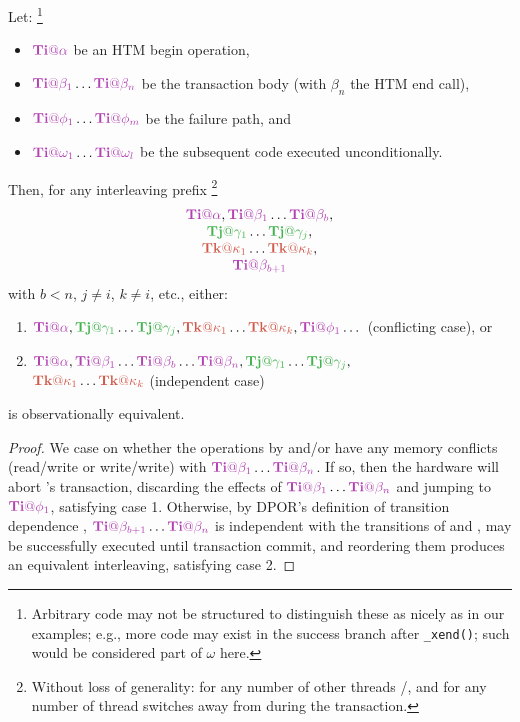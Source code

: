 \documentclass[10pt]{sigplanconf}
\begin{document}
\begin{lemma}
	\label{lem:equiv}
	Let:%
	\footnote{Arbitrary code may not be structured to distinguish these as nicely as in our examples;
	e.g., more code may exist in the success branch after {\tt \_xend()};
	such would be considered part of $\omega$ here.}
	\begin{itemize}
		\item $\tiiat{\alpha}$ be an HTM begin operation,
		\item $\tiiat{\beta_1}\dots\tiiat{\beta_n}$ be the transaction body (with $\beta_n$ the HTM end call),
		\item $\tiiat{\phi_1}\dots\tiiat{\phi_m}$ be the failure path, and
		\item $\tiiat{\omega_1}\dots\tiiat{\omega_l}$ be the subsequent code executed unconditionally.
	\end{itemize}
	Then, for any interleaving prefix%
	\footnote{Without loss of generality: for any number of other threads \tjj/\tkk,
	and for any number of thread switches away from \tii during the transaction.}
	\[
	\begin{tabular}{c}
		$\tiiat{\alpha},\tiiat{\beta_1}\dots\tiiat{\beta_b},$\\
		$\tjjat{\gamma_1}\dots\tjjat{\gamma_j},$ \\
		$\tkkat{\kappa_1}\dots\tkkat{\kappa_k},$ \\
		$\tiiat{\beta_{b+1}}$ %
	\end{tabular}
	\]
	with $b<n$, $j \ne i$, $k \ne i$, etc., either:
	\begin{enumerate}
		\item $\tiiat{\alpha},\tjjat{\gamma_1}\dots\tjjat{\gamma_j},\tkkat{\kappa_1}\dots\tkkat{\kappa_k},\tiiat{\phi_1}\dots$
			(conflicting case), or
		\item $\tiiat{\alpha},\tiiat{\beta_1}\dots\tiiat{\beta_b}\dots\tiiat{\beta_n},\tjjat{\gamma_1}\dots\tjjat{\gamma_j},$ \\
			$\tkkat{\kappa_1}\dots\tkkat{\kappa_k}$
			(independent case)
	\end{enumerate}
	is observationally equivalent.
\end{lemma}

\begin{proof}
	We case on whether the operations by \tjj and/or \tkk have any memory conflicts (read/write or write/write)
	with $\tiiat{\beta_1}\dots\tiiat{\beta_n}$.
	If so, then the hardware will abort \tii's transaction, discarding the effects of $\tiiat{\beta_1}\dots\tiiat{\beta_n}$
	and jumping to $\tiiat{\phi_1}$,
	satisfying case 1.
	Otherwise, by DPOR's definition of transition dependence \cite{dpor,landslide-phdthesis},
	$\tiiat{\beta_{b+1}}\dots\tiiat{\beta_n}$ is independent with the transitions of \tjj and \tkk,
	may be successfully executed until transaction commit,
	and reordering them produces an equivalent interleaving,
	satisfying case 2.
\end{proof}
\end{document}
